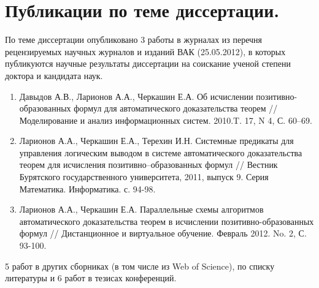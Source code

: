 \section*{Публикации по теме диссертации.} По теме диссертации опубликовано 3 работы в журналах из перечня рецензируемых научных журналов и изданий ВАК (25.05.2012), в которых публикуются научные результаты диссертации на соискание ученой степени доктора и кандидата наук.
\begin{enumerate}
\item Давыдов А.В., Ларионов А.А., Черкашин Е.А. Об исчислении позитивно-образованных формул для автоматического доказательства теорем // Моделирование и анализ информационных систем. 2010.T. 17, N 4, С. 60--69.
\item Ларионов А.А., Черкашин Е.А., Терехин И.Н. Системные предикаты для управления логическим выводом в системе автоматического доказательства теорем для исчисления позитивно--образованных формул // Вестник Бурятского государственного университета, 2011, выпуск 9. Серия Математика. Информатика. с. 94-98.
\item Ларионов А.А., Черкашин Е.А. Параллельные схемы алгоритмов автоматического доказательства теорем в исчислении
позитивно-образованных формул // Дистанционное и виртуальное обучение. Февраль 2012. No. 2, С. 93-100.
\end{enumerate}

5 работ в других сборниках (в том числе из Web of Science), по списку литературы \cite{accs, viner, QUANT4, mipro, semver} и 6 работ в тезисах конференций.



